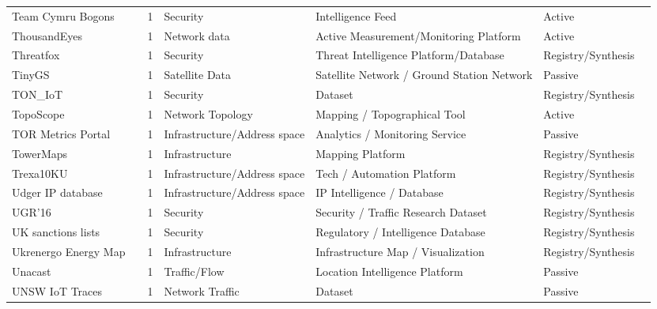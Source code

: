 \documentclass[11pt,a4paper]{article}
\begin{document}
\begin{longtable}{@{}p{}p{}p{}p{}p{}p{}p{}@{}}
Team Cymru Bogons & \cite{bogons} & 1 & Security & Intelligence Feed & Active & \cite{10.1007/978-3-032-18268-5_2} \\
ThousandEyes & \cite{thousandeyes} & 1 & Network data & Active Measurement/Monitoring Platform & Active & \cite{10.1007/978-3-031-85960-1_14} \\
Threatfox & \cite{threatfox} & 1 & Security & Threat Intelligence Platform/Database & Registry/Synthesis & \cite{10.1007/978-3-031-56249-5_9} \\
TinyGS & \cite{tinygs} & 1 & Satellite Data & Satellite Network / Ground Station Network & Passive & \cite{10.1145/3730567.3764496} \\
TON\_IoT & \cite{ton} & 1 & Security & Dataset & Registry/Synthesis & \cite{10.1145/3646547.3689011} \\
TopoScope & \cite{10.1145/3419394.3423627} & 1 & Network Topology & Mapping / Topographical Tool & Active & \cite{10.1145/3487552.3487825} \\
TOR Metrics Portal & \cite{tor} & 1 & Infrastructure/Address space & Analytics / Monitoring Service & Passive & \cite{10.1007/978-3-030-72582-2_28} \\
TowerMaps & \cite{towermaps} & 1 & Infrastructure & Mapping Platform & Registry/Synthesis & \cite{10.1007/978-3-031-85960-1_20} \\
Trexa10KU & \cite{10.1145/3366423.3380104} & 1 & Infrastructure/Address space & Tech / Automation Platform & Registry/Synthesis & \cite{10.1145/3517745.3561444} \\
Udger IP database & \cite{udger} & 1 & Infrastructure/Address space & IP Intelligence / Database & Registry/Synthesis & \cite{10.1145/3618257.3624797} \\
UGR'16 & \cite{ugr16} & 1 & Security & Security / Traffic Research Dataset & Registry/Synthesis & \cite{10.1145/3646547.3689011} \\
UK sanctions lists & \cite{uksanctions} & 1 & Security & Regulatory / Intelligence Database & Registry/Synthesis & \cite{10.1145/3517745.3561423} \\
Ukrenergo Energy Map & \cite{ukrenegro} & 1 & Infrastructure & Infrastructure Map / Visualization & Registry/Synthesis & \cite{10.1145/3730567.3764449} \\
Unacast & \cite{unacast} & 1 & Traffic/Flow & Location Intelligence Platform & Passive & \cite{10.1007/978-3-030-98785-5_6} \\
UNSW IoT Traces & \cite{unsw} & 1 & Network Traffic & Dataset & Passive & \cite{10.1145/3777912.3839801} \\

\end{longtable}
\end{document}
